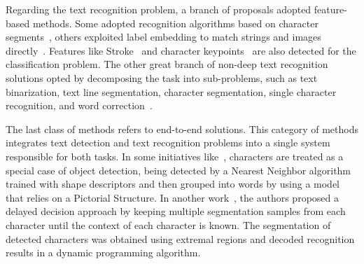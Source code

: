     Regarding the text recognition problem, a branch of proposals adopted feature-based methods. Some adopted recognition algorithms based on character segments~\cite{Shi2013,Yao}, others exploited label embedding to match strings and images directly~\cite{Rodriguez-Serrano,Gordo2014,Almazan2014}. Features like Stroke~\cite{Buta2015} and character keypoints~\cite{Phan2013} are also detected for the classification problem. The other great branch of non-deep text recognition solutions opted by decomposing the task into sub-problems, such as text binarization, text line segmentation, character segmentation, single character recognition, and word correction~\cite{Lee2013,QixiangYe,Nomura2005,Chen2004,Karatzas2004}. 
    
   The last class of methods refers to end-to-end solutions. This category of methods integrates text detection and text recognition problems into a single system responsible for both tasks. In some initiatives like~\cite{Felzenszwalb2005}, characters are treated as a special case of object detection, being detected by a Nearest Neighbor algorithm trained with shape descriptors and then grouped into words by using a model that relies on a Pictorial Structure. In another work~\cite{Neumann2013}, the authors proposed a delayed decision approach by keeping multiple segmentation samples from each character until the context of each character is known. The segmentation of detected characters was obtained using extremal regions and decoded recognition results in a dynamic programming algorithm.
        
